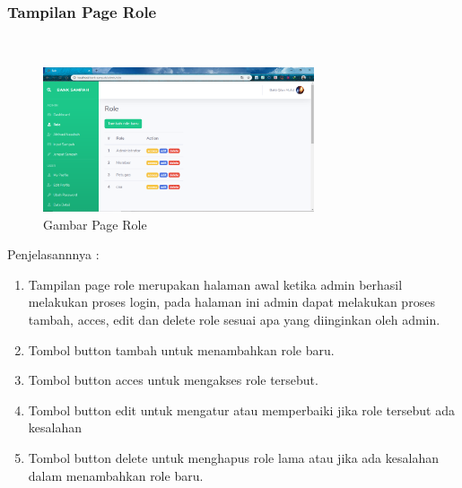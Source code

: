 \subsubsection{Tampilan Page Role}
\hfill\\
	\begin{figure}[H]
		\includegraphics[width=8cm]{figures/analisis/20.png}
		\centering
		\caption{Gambar Page Role}
	\end{figure}
Penjelasannnya :
\begin{enumerate}
\item Tampilan page role merupakan halaman awal ketika admin berhasil melakukan proses login, pada halaman ini admin dapat melakukan proses tambah, acces, edit dan delete role sesuai apa yang diinginkan oleh admin.  
\item Tombol button tambah untuk menambahkan role baru.
\item Tombol button acces untuk mengakses role tersebut.
\item Tombol button edit untuk mengatur atau memperbaiki jika role tersebut ada kesalahan
\item Tombol button delete untuk menghapus role lama atau jika ada kesalahan dalam menambahkan role baru.
\end{enumerate}

	
